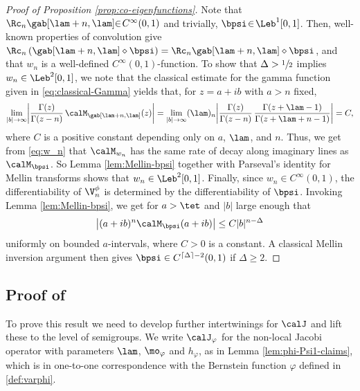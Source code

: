 \begin{proof}[Proof of Proposition \ref{prop:co-eigenfunctions}]
Note that $\Rc_n \gab[\lam+n,\lam]\mkern-5mu\in\!C^\infty(0,1)$ and trivially, \hbox{$\bpsi\!\in\!\Leb^1[0,1]$}. Then, well-known properties of convolution give $\Rc_n\left( \gab[\lam+n,\lam] \diamond \bpsi\right) = \Rc_n \gab[\lam+n,\lam] \diamond \bpsi$, and that $w_n$ is a well-defined $C^\infty(0,1)$-function. To show that $\Delta > \sfrac{1}{2}$ implies $w_n \in \Leb^2[0,1]$, we note that the classical estimate for the gamma function given in \eqref{eq:classical-Gamma} yields that, for $z = a+ib$ with $a > n$ fixed,
\begin{equation*}
\lim_{|b| \to \infty} \biggl| \frac{\Gamma(z)}{\Gamma(z-n)}\, \calM_{\gab[\lam+n,\lam]}(z) \biggr| = \lim_{|b| \to \infty} (\lam)_n \biggl| \frac{\Gamma(z)}{\Gamma(z-n)}\,\frac{\Gamma(z+\lam-1)}{\Gamma(z+\lam+n-1)} \biggr| = C,
\end{equation*}
where $C$ is a positive constant depending only on $a$, $\lam$, and $n$. Thus, we get from \eqref{eq:w_n} that $\calM_{w_n}$ has the same rate of decay along imaginary lines as $\calM_{\bpsi}$. So Lemma \ref{lem:Mellin-bpsi} together with Parseval's identity for Mellin transforms shows that $w_n \in \Leb^2[0,1]$. Finally, since $w_n \in C^\infty(0,1)$, the differentiability of $\V_n^\phi$ is determined by the differentiability of $\bpsi$. Invoking Lemma \ref{lem:Mellin-bpsi}, we get for $a > \tet$ and $|b|$ large enough that
\begin{equation*}
\left| (a+ib)^n \calM_{\bpsi}(a+ib) \right| \leq C |b|^{n-\Delta}
\end{equation*}
uniformly on bounded $a$-intervals, where $C > 0$ is a constant.
A classical Mellin inversion argument then gives $\bpsi \in C^{\lceil \Delta \rceil - 2}(0,1)$
if $\Delta \ge 2$.
\end{proof}

\subsection{Proof of }

To prove this result we need to develop further inter\-twinings for $\calJ$ and lift these to the level of semigroups. We write $\calJ_\varphi$ for the non-local Jacobi operator with parameters $\lam$, $\mo_\varphi$ and $h_\varphi$, as in Lemma \ref{lem:phi-Psi1-claims}, which is in one-to-one correspondence with the Bernstein function $\varphi$ defined in \eqref{def:varphi}.

